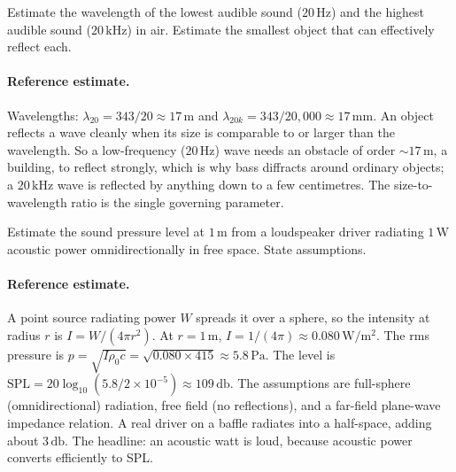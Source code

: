 \begin{exercise}
Estimate the wavelength of the lowest audible sound ($20\,\si{
\hertz}$) and the highest audible sound ($20\,\si{\kilo\hertz}$) in
air. Estimate the smallest object that can effectively reflect each.
\paragraph{Reference estimate.} Wavelengths: $\lambda_{20} = 343/20
\approx 17\,\si{\meter}$ and $\lambda_{20k} = 343/20{,}000 \approx
17\,\si{\milli\meter}$. An object reflects a wave cleanly when its size
is comparable to or larger than the wavelength. So a low-frequency
($20\,\si{\hertz}$) wave needs an obstacle of order $\sim 17\,\si{
\meter}$, a building, to reflect strongly, which is why bass diffracts
around ordinary objects; a $20\,\si{\kilo\hertz}$ wave is reflected by
anything down to a few centimetres. The size-to-wavelength ratio is the
single governing parameter.
\end{exercise}

\begin{exercise}
Estimate the sound pressure level at $1\,\si{\meter}$ from a
loudspeaker driver radiating $1\,\si{\watt}$ acoustic power
omnidirectionally in free space. State assumptions.
\paragraph{Reference estimate.} A point source radiating power $W$
spreads it over a sphere, so the intensity at radius $r$ is
$I = W/(4\pi r^2)$. At $r=1\,\si{\meter}$,
$I = 1/(4\pi) \approx 0.080\,\si{\watt\per\meter\squared}$. The
rms pressure is $p = \sqrt{I\rho_0 c} = \sqrt{0.080\times 415}
\approx 5.8\,\si{\pascal}$. The level is
$\text{SPL} = 20\log_{10}(5.8/2\times 10^{-5}) \approx 109\,\si{
\decibel}$. The assumptions are full-sphere (omnidirectional)
radiation, free field (no reflections), and a far-field plane-wave
impedance relation. A real driver on a baffle radiates into a
half-space, adding about $3\,\si{\decibel}$. The headline: an acoustic
watt is loud, because acoustic power converts efficiently to SPL.
\end{exercise}

